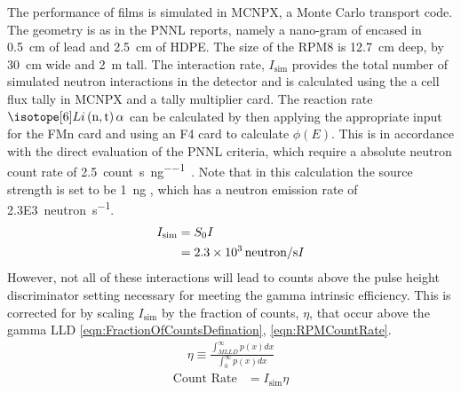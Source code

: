 The performance of films is simulated in MCNPX, a Monte Carlo transport code\cite{pelowitz_mcnpx_2006}.
The geometry is as in the PNNL reports, namely a nano-gram of   encased in \SI{0.5}{\cm} of lead and \SI{2.5}{\cm} of HDPE. 
The size of the RPM8 is \SI{12.7}{\cm} deep, by \SI{30}{\cm} wide and \SI{2}{\m} tall.
The interaction rate, $I_{\text{sim}}$ provides the total number of simulated neutron interactions in the detector and is calculated using the a cell flux tally in MCNPX and a tally multiplier card.
The reaction rate $\iso[6]{Li}\left(\text{n},\text{t}\right)\alpha$ can be calculated by then applying the appropriate input for the FMn card and using an F4 card to calculate $\phi(E)$.
This is in accordance with the direct evaluation of the PNNL criteria, which require a absolute neutron count rate of \SI{2.5}{count\per\second\per\nano\gram{}}.
Note that in this calculation the source strength is set to be \SI{1}{\nano\gram} , which has a neutron emission rate of \SI{2.3E3}{neutron\per\second}.
\begin{align}
  \label{eqn:RPM8InteractionRate}
  I_{\text{sim}} &= S_0 I \\
  &= \SI{2.3E3}{neutron\per\second} I
\end{align}
However, not all of these interactions will lead to counts above the pulse height discriminator setting necessary for meeting the gamma intrinsic efficiency.
This is corrected for by scaling $I_{\text{sim}}$ by the fraction of counts, $\eta$, that occur above the gamma LLD \eqref{eqn:FractionOfCountsDefination}, \eqref{eqn:RPMCountRate}.
\begin{align}
  \label{eqn:FractionOfCountsDefination}
  \eta \equiv \frac{\int_{MLLD}^\infty p(x)dx}{\int_0^\infty p(x)dx}
\end{align}
\begin{align}
 \label{eqn:RPMCountRate}
 \text{Count Rate} &= I_{\text{sim}} \eta
\end{align}
 
